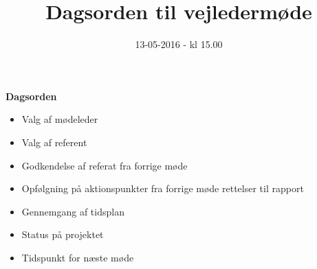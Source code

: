 \documentclass{article}
\title{Dagsorden til vejledermøde}
\date{13-05-2016 - kl 15.00}
\begin{document}
	\maketitle
	\textbf{Dagsorden}
	
	\begin{itemize}
		\item Valg af mødeleder
		\item Valg af referent
		\item Godkendelse af referat fra forrige møde 
		\item Opfølgning på aktionspunkter fra forrige møde
		\subitem rettelser til rapport
		\item Gennemgang af tidsplan
		\item Status på projektet
		\item Tidspunkt for næste møde
	\end{itemize}
\end{document}
